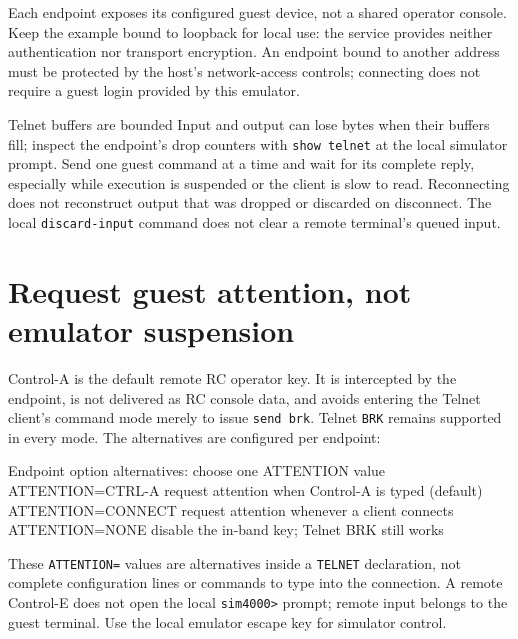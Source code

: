 Each endpoint exposes its configured guest device, not a shared operator console. Keep the example bound to loopback for local use: the service provides neither authentication nor transport encryption. An endpoint bound to another address must be protected by the host's network-access controls; connecting does not require a guest login provided by this emulator.

\begin{operationnote}{Telnet buffers are bounded}
Input and output can lose bytes when their buffers fill; inspect the endpoint's drop counters with \passthrough{\lstinline!show telnet!} at the local simulator prompt. Send one guest command at a time and wait for its complete reply, especially while execution is suspended or the client is slow to read. Reconnecting does not reconstruct output that was dropped or discarded on disconnect. The local \passthrough{\lstinline!discard-input!} command does not clear a remote terminal's queued input.
\end{operationnote}

\section{Request guest attention, not emulator suspension}\label{request-guest-attention-not-emulator-suspension}

Control-A is the default remote RC operator key. It is intercepted by the endpoint, is not delivered as RC console data, and avoids entering the Telnet client's command mode merely to issue \passthrough{\lstinline!send brk!}. Telnet \passthrough{\lstinline!BRK!} remains supported in every mode. The alternatives are configured per endpoint:

\begin{commandexample}{Endpoint option alternatives: choose one ATTENTION value}
ATTENTION=CTRL-A   request attention when Control-A is typed (default)
ATTENTION=CONNECT  request attention whenever a client connects
ATTENTION=NONE     disable the in-band key; Telnet BRK still works
\end{commandexample}

These \passthrough{\lstinline!ATTENTION=!} values are alternatives inside a \passthrough{\lstinline!TELNET!} declaration, not complete configuration lines or commands to type into the connection. A remote Control-E does not open the local \passthrough{\lstinline!sim4000>!} prompt; remote input belongs to the guest terminal. Use the local emulator escape key for simulator control.


